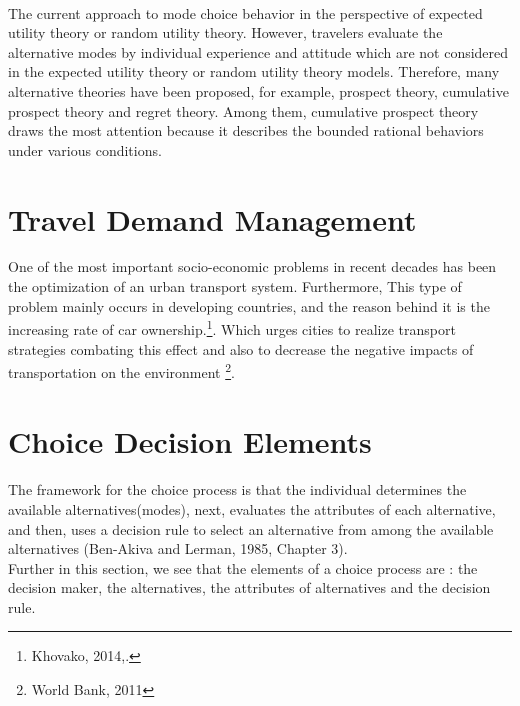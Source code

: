 


\paragraph{}The current approach to mode choice behavior
in the perspective of expected utility theory or random utility theory. However, travelers evaluate the alternative modes by individual experience and attitude which are not considered in the expected utility theory or random utility theory models. Therefore, many alternative theories have been proposed, for example, prospect theory, cumulative prospect theory and regret theory. Among them, cumulative prospect theory draws the most attention because it describes the bounded rational behaviors under various conditions.
\section{Travel Demand Management}
One of the most important socio-economic problems in recent decades has been the optimization of an urban transport system. Furthermore, This type of problem mainly occurs in developing countries, and the reason behind it is the increasing rate of car ownership.\footnote{Khovako, 2014,.}. Which urges cities to realize transport strategies combating this effect and also to decrease the negative impacts of transportation on the environment \footnote{World Bank, 2011}.

\section{Choice Decision Elements}
\paragraph {}The framework for the choice process is that the individual determines the available alternatives(modes), next, evaluates the attributes of each alternative, and then, uses a decision rule to select an alternative from among the available alternatives (Ben-Akiva and Lerman, 1985, Chapter 3).\\
Further in this section, we see that the elements of a choice process are : the decision maker, the alternatives, the attributes of alternatives and the decision rule.
